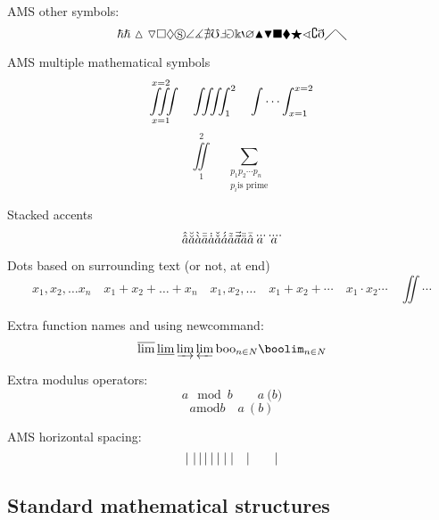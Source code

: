 \documentclass[12pt,a4paper]{article}
\theoremstyle{clearprint}
\newcommand{\boo}{\mathrm{boo}}
\begin{document}
\noindent
AMS other symbols:
\begin{equation}
\boldsymbol{\hbar \hslash \vartriangle \triangledown \square \lozenge \circledS \angle \measuredangle \nexists \mho \Finv \Game \Bbbk \backprime \varnothing \blacktriangle \blacktriangledown \blacksquare \blacklozenge \bigstar \sphericalangle \complement \eth \diagup \diagdown}
\end{equation}

\noindent
AMS multiple mathematical symbols
\begin{equation}
\iiint\limits_{x=1}^{x=2} \quad \iiiint_1^2 \quad \idotsint_{x=1}^{x=2} 
\end{equation}
\begin{equation}
\iint\limits_1^2 \quad  \sum_{\substack{p_1p_2\cdots p_{n}\\p_i \text{is prime}}}
\end{equation}

\noindent
Stacked accents
\begin{equation}
\Hat{\Hat{a}} \Breve{\Breve{a}} \Grave{\Grave{a}} \Bar{\Bar{a}} \Dot{\Dot{a}} \Check{\Check{a}} \Acute{\Acute{a}} \Tilde{\Tilde{a}} \Vec{\Vec{a}} \Ddot{\Ddot{a}} \Bar{\Hat{a}} \dddot{a} \ddddot{a}
\end{equation}

\noindent
Dots based on surrounding text (or not, at end)
\begin{equation}
x_1, x_2, \dots x_n \quad x_1 + x_2 + \dots + x_n \quad x_1,x_2, \dotsc \quad x_1 + x_2 + \dotsb \quad x_1 \cdot x_2 \dotsm \quad \iint \dotsi
\end{equation}

\noindent 
Extra function names and using newcommand:
\begin{equation}
\varlimsup \varliminf \varinjlim \varprojlim \boo_{n \in N} \boolim_{n \in N}
\end{equation}

\noindent 
Extra modulus operators:
\begin{equation}
a \mod{b} \qquad a \pod{b}
\end{equation}
\begin{equation}
a \mathrm{mod} b \quad a \: (b)
\end{equation}

\noindent 
AMS horizontal spacing:
\begin{equation}
|~|\thinspace|\,|\medspace|\:|\thickspace|\;|\quad | \qquad |
\end{equation}

\subsection[Maths structures]{Standard mathematical structures}
\setcounter{equation}{0}
\end{document}
